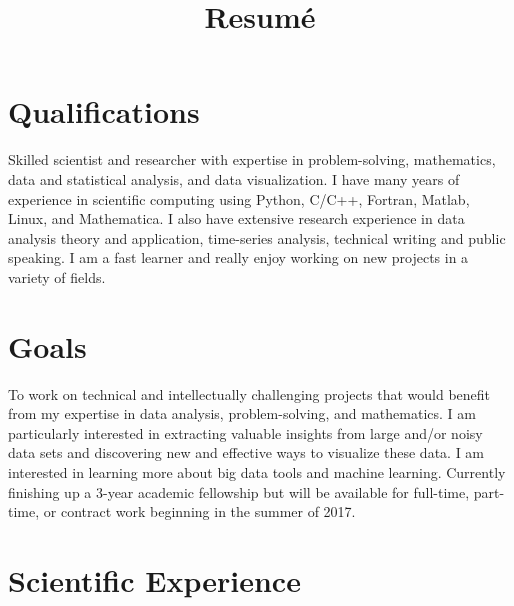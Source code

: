 \documentclass[11pt,letterpaper,sans]{moderncv} %
\title{Resum\'{e}}
\begin{document}
\makecvtitle %


\section{Qualifications}
\vspace{6pt}

Skilled scientist and researcher with expertise in problem-solving, mathematics, data and statistical analysis, and data visualization. I have many years of experience in scientific computing using Python, C/C++, Fortran, Matlab, Linux, and Mathematica. I also have extensive research experience in data analysis theory and application, time-series analysis, technical writing and public speaking. I am a fast learner and really enjoy working on new projects in a variety of fields.


\section{Goals}
\vspace{6pt}

To work on technical and intellectually challenging projects that would benefit from my expertise in data analysis, problem-solving, and mathematics. I am particularly interested in extracting valuable insights from large and/or noisy data sets and discovering new  and effective ways to visualize these data. I am interested in learning more about big data tools and machine learning. Currently finishing up a 3-year academic fellowship but will be available for full-time, part-time, or contract work beginning in the summer of 2017.


\section{Scientific Experience}
\vspace{6pt}
\end{document}
